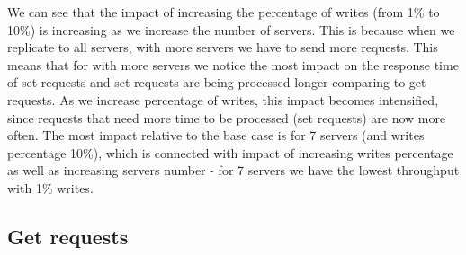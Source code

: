 \documentclass[11pt]{article}
\begin{document}
We can see that the impact of increasing the percentage of writes (from 1\% to 10\%) is increasing as we increase the number of servers. This is because when we replicate to all servers, with more servers we have to send more requests. This means that for with more servers we notice the most impact on the response time of set requests and set requests are being processed longer comparing to get requests. As we increase percentage of writes, this impact becomes intensified, since requests that need more time to be processed (set requests) are now more often. The most impact relative to the base case is for 7 servers (and writes percentage 10\%), which is connected with impact of increasing writes percentage as well as increasing servers number - for 7 servers we have the lowest throughput with 1\% writes.

\subsection{Get requests}
\end{document}
